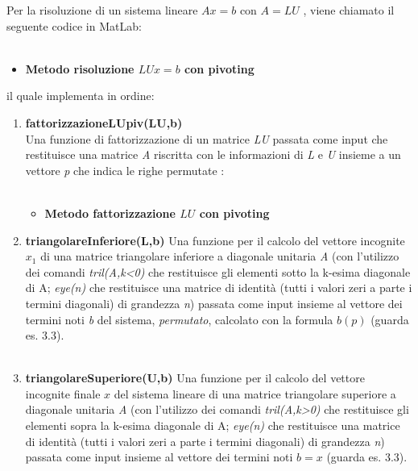 Per la risoluzione di un sistema lineare $Ax=b$ con $A=LU$ , viene chiamato il seguente codice in MatLab:\\\
\begin{itemize}
	\item \textbf{Metodo risoluzione $LUx=b$ con pivoting}
		
\end{itemize}
il quale implementa in ordine:
\begin{enumerate}
	\item \textbf{fattorizzazioneLUpiv(LU,b)}\\
		Una funzione di fattorizzazione di un matrice \textit{LU} passata come input che restituisce una matrice \textit{A} riscritta con le informazioni di \textit{L} e \textit{U} insieme a un vettore \textit{p} che indica le righe permutate :\\\
\begin{itemize}
	\item \textbf{Metodo fattorizzazione $LU$ con pivoting}
		
\end{itemize}
	\item \textbf{triangolareInferiore(L,b)}
		Una funzione per il calcolo del vettore incognite $x_1$ di una matrice triangolare inferiore a diagonale unitaria \textit{A} (con l'utilizzo dei comandi \textit{tril(A,k<0)} che restituisce gli elementi sotto la k-esima diagonale di A; \textit{eye(n)} che restituisce una matrice di identità (tutti i valori zeri a parte i termini diagonali) di grandezza \textit{n}) passata come input insieme al vettore dei termini noti \textit{b} del sistema, \textit{permutato}, calcolato con la formula $b(p)$ (guarda es. 3.3). \\\
	\item \textbf{triangolareSuperiore(U,b)}
		Una funzione per il calcolo del vettore incognite finale $x$ del sistema lineare di una matrice triangolare superiore a diagonale unitaria \textit{A} (con l'utilizzo dei comandi \textit{tril(A,k>0)} che restituisce gli elementi sopra la k-esima diagonale di A; \textit{eye(n)} che restituisce una matrice di identità (tutti i valori zeri a parte i termini diagonali) di grandezza \textit{n}) passata come input insieme al vettore dei termini noti $b=x$ (guarda es. 3.3).\\\
\end{enumerate}